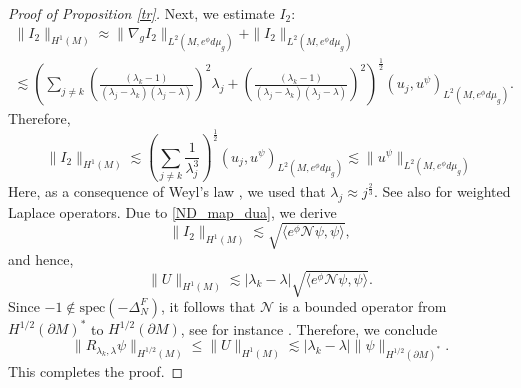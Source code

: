 \documentclass[12pt,a4paper]{amsart}
\numberwithin{equation}{section}
\theoremstyle{plain}
\theoremstyle{definition}
\begin{document}
\begin{proof}[Proof of Proposition \ref{tr}]
    Next, we estimate $I_2$:
    \begin{multline*}
        \|I_2\|_{H^1(M)} \approx \|\nabla_gI_2\|_{L^2(M,e^\phi d\mu_g)} + \|I_2\|_{L^2(M,e^\phi d\mu_g)}\\
        \lesssim \left( \sum_{j\neq k} \left(\frac{(\lambda_k - 1)}{(\lambda_j - \lambda_k)(\lambda_j - \lambda)}\right)^2\lambda_j + \left(\frac{(\lambda_k - 1)}{(\lambda_j - \lambda_k)(\lambda_j - \lambda)}\right)^2 \right)^{\frac{1}{2}}(u_j,u^\psi)_{L^2(M,e^\phi d\mu_g)}.
    \end{multline*}
    Therefore,
    \begin{equation*}
        \|I_2\|_{H^1(M)} \lesssim \left(\sum_{j\neq k} \frac{1}{\lambda_j^3} \right)^{\frac{1}{2}}(u_j,u^\psi)_{L^2(M,e^\phi d\mu_g)} \lesssim \|u^\psi\|_{L^2(M,e^\phi d\mu_g)}
    \end{equation*}
    Here, as a consequence of Weyl's law \cite{Weyl}, we used that $\lambda_j \approx j^{\frac{2}{3}}$. See also \cite{BNR} for weighted Laplace operators. Due to \eqref{ND_map_dua}, we derive 
    \begin{equation*}
        \|I_2\|_{H^1(M)} \lesssim \sqrt{\langle e^\phi \mathcal{N} \psi,\psi \rangle},
    \end{equation*}
    and hence, 
    \begin{equation*}
        \|U\|_{H^1(M)} \lesssim |\lambda_k - \lambda|\sqrt{\langle e^\phi \mathcal{N} \psi,\psi \rangle}.
    \end{equation*}
    Since $-1 \notin \mathrm{spec} (-\Delta_N^F)$, it follows that $\mathcal{N}$ is a bounded operator from $H^{1/2}(\partial M)^*$ to $H^{1/2}(\partial M)$, see for instance \cite{BEHRNDT20155903}. Therefore, we conclude 
    \begin{equation*}
        \|R_{\lambda_k,\lambda}\psi\|_{H^{1/2}(M)} \leq \|U\|_{H^1(M)} \lesssim |\lambda_k - \lambda| \|\psi\|_{H^{1/2}(\partial M)^*}.
    \end{equation*}
    This completes the proof. 


\end{proof}
\end{document}
